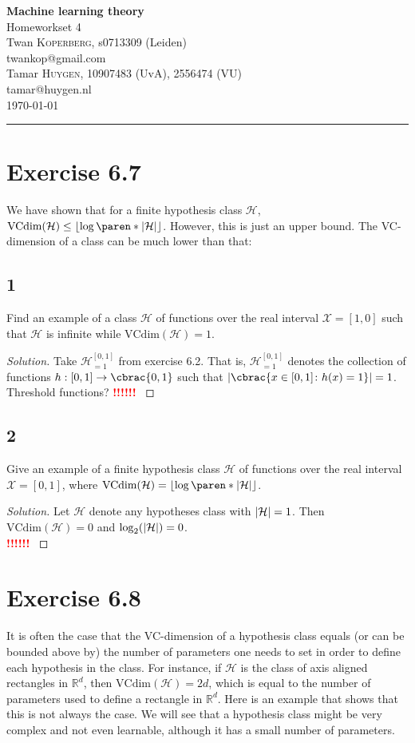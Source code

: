 \documentclass[10pt, a4paper, twoside]{amsart}
\makeatletter
\newcommand{\R}{\ensuremath{\mathbb{R}}}
\DeclarePairedDelimiter\abs{\lvert}{\rvert}
\DeclarePairedDelimiter\cbrac\{\}
\DeclarePairedDelimiter\paren()
\renewcommand{\c}{\ensuremath{\colon}}
\newcommand{\cH}{\ensuremath{\mathcal{H}}}
\newcommand{\cX}{\ensuremath{\mathcal{X}}}
\newenvironment{solution}
               {\let\oldqedsymbol=\qedsymbol
                \renewcommand{\qedsymbol}{$\blacktriangleleft$}
                \begin{proof}[Solution]}
               {\end{proof}
                \renewcommand{\qedsymbol}{\oldqedsymbol}}
\newcommand{\TODO}{\textcolor{red}{\textbf{!!!!!! }}}
\newcommand{\firstName}  {Twan}
\newcommand{\lastName}   {Koperberg}
\newcommand{\studId}     {0713309 (Leiden)}
\renewcommand{\email}    {twankop@gmail.com}
\newcommand{\firstNameII}  {Tamar}
\newcommand{\lastNameII}   {Huygen}
\newcommand{\studIdII}     {10907483 (UvA)}
\newcommand{\studIdIII}    {2556474 (VU)}
\newcommand{\emailII}     {tamar@huygen.nl}
\makeatother
\begin{document}
\begin{center}

  {\huge\bf Machine learning theory}\\
  {\large\sc Homeworkset 4 }\\ \vspace{1em}
  \firstName \textsc{ \lastName}, {\sc s}\studId \\
  \email\text{}\\ \smallskip
  \firstNameII \textsc{ \lastNameII}, \studIdII, \studIdIII\\
  \emailII \\ \bigskip
  \today \\\bigskip
  \hrule
  \bigskip
 \end{center}

 \section*{Exercise 6.7}
 We have shown that for a finite hypothesis class $\cH$, $\text{VCdim}(\cH) \leq \left\lfloor \log \paren*{\abs{\cH}} \right\rfloor$. However, this is just an upper bound. The VC-dimension of a class can be much lower than that:
 \subsection*{1}
 Find an example of a class $\cH$ of functions over the real interval $\cX = [1,0]$ such that $\cH$ is infinite while $\text{VCdim}(\cH) = 1$.
\begin{solution}
 Take $\cH_{=1}^{[0,1]}$ from exercise 6.2. That is, $\cH_{=1}^{[0,1]}$ denotes the collection of functions 
 $h:[0,1]\to \cbrac{0,1}$ such that $\abs{\cbrac{x \in [0,1] \c h(x)=1}}=1$.\\
   Threshold functions?
 \TODO
\end{solution}
\subsection*{2}
Give an example of a finite hypothesis class $\cH$ of functions over the real interval $\cX = [0,1]$, where $\text{VCdim}(\cH) = \left\lfloor \log \paren*{\abs{\cH}} \right\rfloor$.
 \begin{solution}
   Let $\cH$ denote any hypotheses class with $\abs{\cH}=1$. Then $\mathrm{VCdim}(\cH)=0$ and $\log_2(\abs{\cH})=0$.\\
   \TODO
 \end{solution}
 
\section*{Exercise 6.8}
It is often the case that the VC-dimension of a hypothesis class equals (or can be bounded above by) the number of parameters one needs to set in order to define each hypothesis in the class. For instance, if $\cH$ is the class of axis aligned rectangles in $\R^d$, then $\text{VCdim}(\cH) = 2d$, which is equal to the number of parameters used to define a rectangle in $\R^d$. Here is an example that shows that this is not always the case. We will see that a hypothesis class might be very complex and not even learnable, although it has a small number of parameters.
\end{document}
